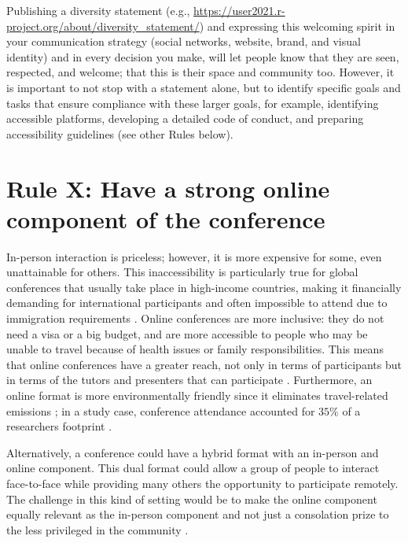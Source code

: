 \documentclass[10pt,letterpaper]{article}
\begin{document}
Publishing a diversity statement (e.g., \url{https://user2021.r-project.org/about/diversity_statement/}) and expressing this welcoming spirit in your communication strategy (social networks, website, brand, and visual identity) and in every decision you make, will let people know that they are seen, respected, and welcome; that this is their space and community too. However, it is important to not stop with a statement alone, but to identify specific goals and tasks that ensure compliance with these larger goals, for example, identifying accessible platforms, developing a detailed code of conduct, and preparing accessibility guidelines (see other Rules below).


\section{Rule X: Have a strong online component of the conference} 

In-person interaction is priceless; however, it is more expensive for some, even unattainable for others. This inaccessibility is particularly true for global conferences that usually take place in high-income countries, making it financially demanding for international participants and often impossible to attend due to immigration requirements \cite{arend_disparity_2019, gewin_what_2019}. Online conferences are more inclusive: they do not need a visa or a big budget, and are more accessible to people who may be unable to travel because of health issues or family responsibilities. This means that online conferences have a greater reach, not only in terms of participants but in terms of the tutors and presenters that can participate \cite{atkinson_r_medicine_2021}. Furthermore, an online format is more environmentally friendly since it eliminates travel-related emissions \cite{sarabipour_evaluating_2020, niner_better_2021}; in a study case, conference attendance accounted for $35\%$ of a researchers footprint .

Alternatively, a conference could have a hybrid format with an in-person and online component. This dual format could allow a group of people to interact face-to-face while providing many others the opportunity to participate remotely. The challenge in this kind of setting would be to make the online component equally relevant as the in-person component and not just a consolation prize to the less privileged in the community \cite{niner_better_2021}. 
\end{document}
